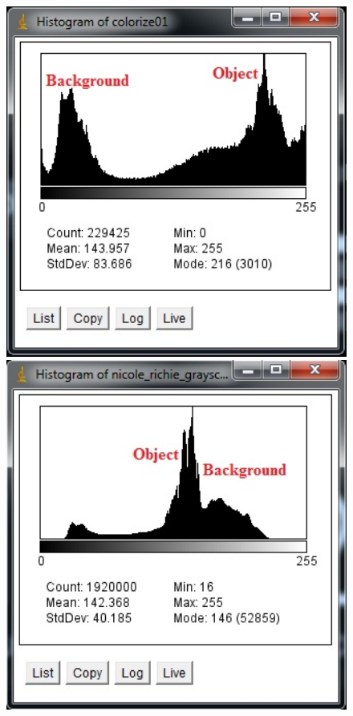 \begin{figure}[htbp] \centering
\begin{minipage}[b]{0.48\textwidth} \centering
\includegraphics[width=1.00\textwidth]{Pictures/Theory/SimpleThresholdPicture} %
\end{minipage} \hfill
\begin{minipage}[b]{0.48\textwidth} \centering
\includegraphics[width=1.00\textwidth]{Pictures/Theory/ComplicatedThresholdPicture} %

\end{minipage}
\end{figure}
